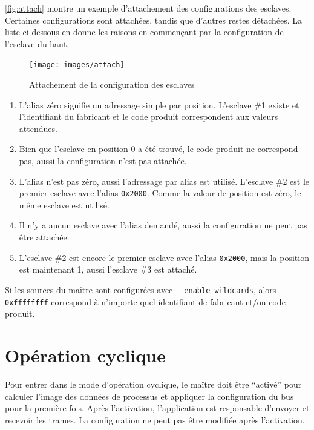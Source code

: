 \documentclass[a4paper,12pt,BCOR=6mm,bibtotoc,idxtotoc]{scrbook}
\begin{document}
\autoref{fig:attach} montre un exemple d'attachement des
configurations des esclaves. Certaines configurations sont
attach\'ees, tandis que d'autres restes d\'etach\'ees. La liste
ci-dessous en donne les raisons en commen\c{c}ant par la configuration
de l'esclave du haut.

\begin{figure}[htbp]
  \centering
  \texttt{[image: images/attach]}
  \caption{Attachement de la configuration des esclaves}
  \label{fig:attach}
\end{figure}

\begin{enumerate}

\item L'alias z\'ero signifie un adressage simple par position.
  L'esclave \#1 existe et l'identifiant du fabricant et le code
  produit correspondent aux valeurs attendues.

\item Bien que l'esclave en position 0 a \'et\'e trouv\'e, le code
  produit ne correspond pas, aussi la configuration n'est pas
  attach\'ee.

\item L'alias n'est pas z\'ero, aussi l'adressage par alias est
  utilis\'e.  L'esclave \#2 est le premier esclave avec l'alias
  \lstinline+0x2000+. Comme la valeur de position est z\'ero, le
  m\^eme esclave est utilis\'e.

\item Il n'y a aucun esclave avec l'alias demand\'e, aussi la
  configuration ne peut pas \^etre attach\'ee.

\item L'esclave \#2 est encore le premier esclave avec l'alias
  \lstinline+0x2000+, mais la position est maintenant 1, aussi
  l'esclave \#3 est attach\'e.
\end{enumerate}

Si les sources du ma\^itre sont configur\'ees avec
\lstinline+--enable-wildcards+, alors
\lstinline+0xffffffff+ correspond \`a n'importe quel identifiant de fabricant et/ou code produit.


\section{Op\'eration cyclique}
\label{sec:cyclic}

Pour entrer dans le mode d'op\'eration cyclique, le ma\^itre doit \^etre
``activ\'e'' pour calculer l'image des donn\'ees de processus et appliquer
la configuration du bus pour la premi\`ere fois. Apr\`es l'activation,
l'application est responsable d'envoyer et recevoir les trames.
La configuration ne peut pas \^etre modifi\'ee apr\`es l'activation.
\end{document}
